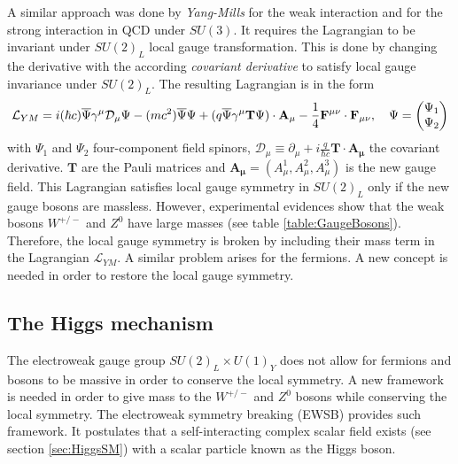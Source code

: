 A similar approach was done by \textit{Yang-Mills} for the weak interaction and for the strong interaction in QCD under $SU(3)$. It requires the Lagrangian to be invariant under $SU(2)_{L}$ local gauge transformation. This is done by changing the derivative with the according \textit{covariant derivative} to satisfy local gauge invariance under $SU(2)_{L}$. The resulting Lagrangian is in the form \cite{Griffiths:343277}
\begin{equation}
  \mathcal{L}_{YM} = i(\hbar c)\overline{\rm \Psi}\gamma^{\mu}\mathcal{D}_{\mu}\Psi - (mc^2)\overline{\rm \Psi}\Psi + (q\overline{\rm \Psi}\gamma^{\mu}\mathbf{T}\Psi) \cdot \mathbf{A_{\mu}} - \frac{1}{4}\mathbf{F^{\mu\nu}} \cdot \mathbf{F_{\mu\nu}}, \quad \Psi = \begin{pmatrix} \Psi_1 \\ \Psi_2 \end{pmatrix}
\end{equation}
with $\Psi_1$ and $\Psi_2$ four-component field spinors, $\mathcal{D}_{\mu} \equiv \partial_{\mu} + i\frac{q}{\hbar c}\mathbf{T} \cdot \mathbf{A_{\mu}}$ the covariant derivative. $\mathbf{T}$ are the Pauli matrices and $\mathbf{A_{\mu}} = (A_{\mu}^1, A_{\mu}^2, A_{\mu}^3)$ is the new gauge field. This Lagrangian satisfies local gauge symmetry in $SU(2)_{L}$ only if the new gauge bosons are massless. However, experimental evidences \cite{Rubbia:1983pta} show that the weak bosons $W^{+/-}$ and $Z^0$ have large masses (see table \ref{table:GaugeBosons}). Therefore, the local gauge symmetry is broken by including their mass term in the Lagrangian $\mathcal{L}_{YM}$. A similar problem arises for the fermions. A new concept is needed in order to restore the local gauge symmetry.

\subsection{The Higgs mechanism}
\label{subsec:HiggsMecha}

The electroweak gauge group $SU(2)_{L} \times U(1)_{Y}$ does not allow for fermions and bosons to be massive in order to conserve the local symmetry. A new framework is needed in order to give mass to the $W^{+/-}$ and $Z^0$ bosons while conserving the local symmetry. The electroweak symmetry breaking (EWSB) provides such framework. It postulates that a self-interacting complex scalar field exists (see section \ref{sec:HiggsSM}) with a scalar particle known as the Higgs boson.

